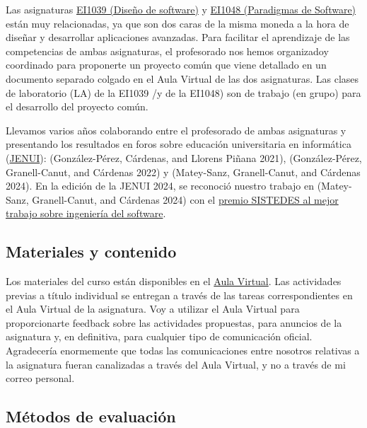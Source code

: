 \documentclass[
  letterpaper,
  DIV=11,
  numbers=noendperiod]{scrartcl}
\begin{document}
Las asignaturas
\href{https://ujiapps.uji.es/sia/rest/publicacion/2024/estudio/225/asignatura/EI1039}{EI1039
(Diseño de software)} y
\href{https://ujiapps.uji.es/sia/rest/publicacion/2024/estudio/225/asignatura/EI1048}{EI1048
(Paradigmas de Software)} están muy relacionadas, ya que son dos caras
de la misma moneda a la hora de diseñar y desarrollar aplicaciones
avanzadas. Para facilitar el aprendizaje de las competencias de ambas
asignaturas, el profesorado nos hemos organizadoy coordinado para
proponerte un proyecto común que viene detallado en un documento
separado colgado en el Aula Virtual de las dos asignaturas. Las clases
de laboratorio (LA) de la EI1039 /y de la EI1048) son de trabajo (en
grupo) para el desarrollo del proyecto común.

Llevamos varios años colaborando entre el profesorado de ambas
asignaturas y presentando los resultados en foros sobre educación
universitaria en informática (\href{https://aenui.org/jenui/}{JENUI}):
(González-Pérez, Cárdenas, and Llorens Piñana 2021), (González-Pérez,
Granell-Canut, and Cárdenas 2022) y (Matey-Sanz, Granell-Canut, and
Cárdenas 2024). En la edición de la JENUI 2024, se reconoció nuestro
trabajo en (Matey-Sanz, Granell-Canut, and Cárdenas 2024) con el
\href{https://jenui2024.udc.es/premios-jenui-2024/}{premio SISTEDES al
mejor trabajo sobre ingeniería del software}.

\subsection{Materiales y contenido}\label{materiales-y-contenido}

Los materiales del curso están disponibles en el
\href{https://aulavirtual.uji.es/course/view.php?id=81645}{Aula
Virtual}. Las actividades previas a título individual se entregan a
través de las tareas correspondientes en el Aula Virtual de la
asignatura. Voy a utilizar el Aula Virtual para proporcionarte feedback
sobre las actividades propuestas, para anuncios de la asignatura y, en
definitiva, para cualquier tipo de comunicación oficial. Agradecería
enormemente que todas las comunicaciones entre nosotros relativas a la
asignatura fueran canalizadas a través del Aula Virtual, y no a través
de mi correo personal.

\subsection{Métodos de evaluación}\label{muxe9todos-de-evaluaciuxf3n}
\end{document}
